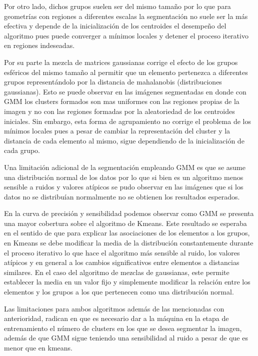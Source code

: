 \documentclass[10pt,twocolumn,letterpaper]{article}
\begin{document}
Por otro lado, dichos grupos suelen ser del mismo tamaño por lo que para geometrías con regiones a diferentes escalas la segmentación no suele ser la más efectiva y depende de la inicialización de los centroides el desempeño del algoritmo pues puede converger a mínimos locales y detener el proceso iterativo en regiones indeseadas. 

Por su parte la mezcla de matrices gaussianas corrige el efecto de los grupos esféricos del mismo tamaño al permitir que un elemento pertenezca a diferentes grupos representándolo por la distancia de mahalanobis (distribuciones gaussianas). Esto se puede observar en las imágenes segmentadas en donde con GMM los clusters formados son mas uniformes con las regiones propias de la imagen y no con las regiones formadas por la aleatoriedad de los centroides iniciales. Sin embargo, esta forma de agrupamiento no corrige el problema de los mínimos locales pues a pesar de cambiar la representación del cluster y la distancia de cada elemento al mismo, sigue dependiendo de la inicialización de cada grupo.

Una limitación adicional de la segmentación empleando GMM es que se asume una distribución normal de los datos por lo que si bien es un algoritmo menos sensible a ruidos y valores atípicos se pudo observar en las imágenes que si los datos no se distribuían normalmente no se obtienen los resultados esperados.

En la curva de precisión y sensibilidad podemos  observar como GMM se presenta una mayor cobertura sobre el algoritmo de Kmeans. Este resultado se esperaba en el sentido de que para explicar las asociaciones de los elementos a los grupos, en Kmeans se debe modificar la media de la distribución constantemente durante el proceso iterativo lo que hace el algoritmo más sensible al ruido, los valores atípicos y en general a los cambios significativos entre elementos a distancias similares. En el caso del algoritmo de mezclas de gaussianas, este permite establecer la media en un valor fijo y simplemente modificar la relación entre los elementos y los grupos a los que pertenecen como una distribución normal.

Las limitaciones para ambos algoritmos además de las mencionadas con anterioridad, radican en que es necesario dar a la máquina en la etapa de entrenamiento el número de clusters en los que se desea segmentar la imagen, además de que GMM sigue teniendo una sensibilidad al ruido a pesar de que es menor que en kmeans.
\end{document}
